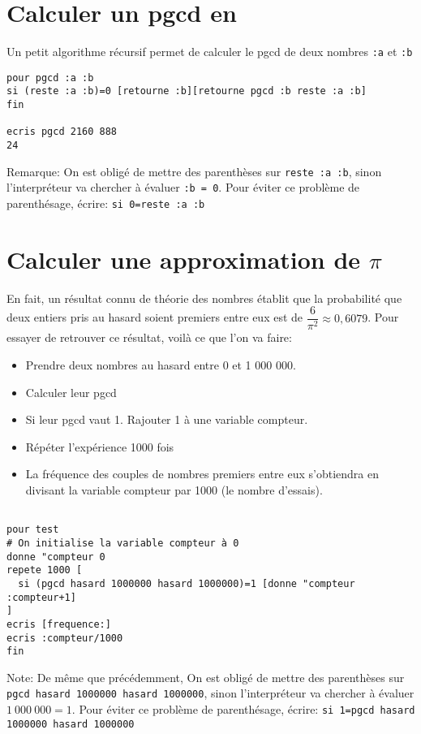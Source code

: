 \section{Calculer un pgcd en \logo}
\noindent Un petit algorithme récursif permet de calculer le pgcd de deux nombres \texttt{:a} et \texttt{:b}
\begin{verbatim}
pour pgcd :a :b
si (reste :a :b)=0 [retourne :b][retourne pgcd :b reste :a :b] 
fin

ecris pgcd 2160 888 
24
\end{verbatim}
Remarque: On est obligé de mettre des parenthèses sur \texttt{reste :a :b}, sinon l'interpréteur va chercher à évaluer \texttt{:b = 0}. Pour éviter ce problème de parenthésage, écrire: \texttt{si 0=reste :a :b}

\section{Calculer une approximation de $\pi$}
\noindent En fait, un résultat connu de théorie des nombres établit que la probabilité que deux entiers pris au hasard soient premiers entre eux est de $\dfrac{6}{\pi^2}\approx 0,6079$. Pour essayer de retrouver ce résultat, voilà ce que l'on va faire:
\begin{itemize}
\item Prendre deux nombres au hasard entre 0 et 1 000 000.
\item Calculer leur pgcd
\item Si leur pgcd vaut 1. Rajouter 1 à une variable compteur.
\item Répéter l'expérience 1000 fois
\item La fréquence des couples de nombres premiers entre eux s'obtiendra en divisant la variable compteur par 1000 (le nombre d'essais).
\end{itemize}
\begin{verbatim}

pour test
# On initialise la variable compteur à 0
donne "compteur 0
repete 1000 [ 
  si (pgcd hasard 1000000 hasard 1000000)=1 [donne "compteur :compteur+1]
]
ecris [frequence:]
ecris :compteur/1000
fin

\end{verbatim}
Note: De même que précédemment, On est obligé de mettre des parenthèses sur \texttt{pgcd hasard 1000000 hasard 1000000}, sinon l'interpréteur va chercher à évaluer $1\ 000\ 000 = 1$. Pour éviter ce problème de parenthésage, écrire: \texttt{si 1=pgcd hasard 1000000 hasard 1000000}\\ \\
